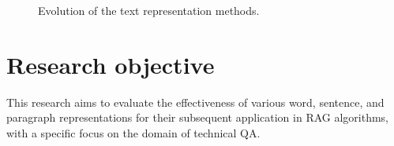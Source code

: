 \begin{figure}
 \centering
    
 \caption{Evolution of the text representation methods.}
  \label{fig:ecolution_text_representation}
\end{figure}

\section{Research objective}

This research aims to evaluate the effectiveness of various word, sentence, and paragraph representations for their subsequent application in \ac{RAG} algorithms, with a specific focus on the domain of technical \ac{QA}.